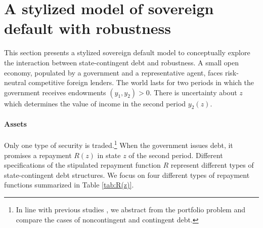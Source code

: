 \section{A stylized model of sovereign default with robustness \label{sec:2permodel}}

This section presents a stylized sovereign default model to conceptually explore the interaction between state-contingent debt and robustness. A small open economy, populated by a government and a representative agent, faces risk-neutral competitive foreign lenders. The world lasts for two periods in which the government receives endowments $(y_1, y_2)>0$. There is uncertainty about $z$ which determines the value of income in the second period $y_2(z)$.

\paragraph{Assets} Only one type of security is traded.\footnote{In line with previous studies \citep{BorenszteinMauro2004, Durdu, HMindexed2012, HMSP16, SandlerisSaprizaTaddei2017, KimOstry2021, SosaPadillaStruzenegger2021}, we abstract from the portfolio problem and compare the cases of noncontingent and contingent debt.}
When the government issues debt, it promises a repayment $R(z)$ in state $z$ of the second period. Different specifications of the stipulated repayment function $R$ represent different types of state-contingent debt structures. We focus on four different types of repayment functions summarized in Table \ref{tab:R(z)}.

